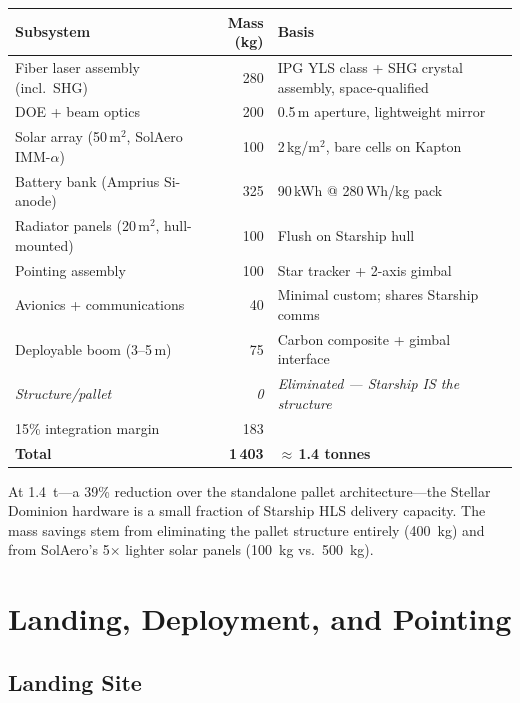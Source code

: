 \documentclass[12pt,letterpaper]{article}
\begin{document}
\begin{center}
\begin{tabular}{lrp{5.5cm}}
\toprule
\textbf{Subsystem} & \textbf{Mass (kg)} & \textbf{Basis} \\
\midrule
Fiber laser assembly (incl.\ SHG) & 280 & IPG YLS class + SHG crystal assembly, space-qualified \\
DOE + beam optics & 200 & 0.5\,m aperture, lightweight mirror \\
Solar array (50\,m$^2$, SolAero IMM-$\alpha$) & 100 & 2\,kg/m$^2$, bare cells on Kapton \\
Battery bank (Amprius Si-anode) & 325 & 90\,kWh @ 280\,Wh/kg pack \\
Radiator panels (20\,m$^2$, hull-mounted) & 100 & Flush on Starship hull \\
Pointing assembly & 100 & Star tracker + 2-axis gimbal \\
Avionics + communications & 40 & Minimal custom; shares Starship comms \\
Deployable boom (3--5\,m) & 75 & Carbon composite + gimbal interface \\
\textit{Structure/pallet} & \textit{0} & \textit{Eliminated --- Starship IS the structure} \\
15\% integration margin & 183 & \\
\midrule
\textbf{Total} & \textbf{1\,403} & \textbf{$\approx$\,1.4 tonnes} \\
\bottomrule
\end{tabular}
\end{center}

\noindent At \SI{1.4}{\tonne}---a 39\% reduction over the standalone pallet
architecture---the Stellar Dominion hardware is a small fraction of Starship
HLS delivery capacity. The mass savings stem from eliminating the pallet
structure entirely (\SI{400}{\kilo\gram}) and from SolAero's 5$\times$
lighter solar panels (\SI{100}{\kilo\gram} vs.\ \SI{500}{\kilo\gram}).

\section{Landing, Deployment, and Pointing}

\subsection{Landing Site}
\end{document}
